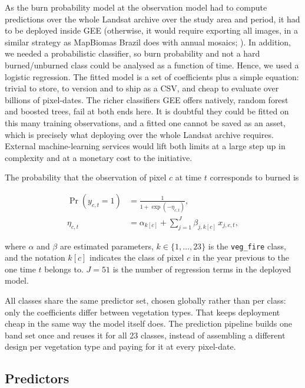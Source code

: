 \documentclass[11pt,a4paper]{article}
\begin{document}
As the burn probability model at the observation model had to compute predictions over the whole 
Landsat archive over the study area and period, it had to be deployed inside GEE
(otherwise, it would require exporting all images, in a similar strategy as MapBiomas Brazil does
with annual mosaics; \cite{alencar2022mapbiomas_fire}). In addition, we needed a probabilistic
classifier, so burn probability and not a hard burned/unburned class could be analysed as a function
of time. Hence, we used a logistic regression. The fitted model is a set of coefficients plus a 
simple equation: trivial to store, to version and to
ship as a CSV, and cheap to evaluate over billions of pixel-dates. The richer classifiers GEE
offers natively, random forest and boosted trees, fail at both ends here. It is doubtful they
could be fitted on this many training observations, and a fitted one cannot be saved as an asset,
which is precisely what deploying over the whole Landsat archive requires. External
machine-learning services would lift both limits at a large step up in complexity and at a
monetary cost to the initiative.

The probability that the observation of pixel \(c\) at time \(t\) corresponds to burned is

\begin{equation}
  \label{eq-logistic}
  \begin{aligned}
    \Pr(y_{c,t} = 1) &= \frac{1}{1 + \exp(-\eta_{c,t})}, \\
    \eta_{c,t} &= \alpha_{k[c]} + \sum_{j=1}^{J} \beta_{j,k[c]}\, x_{j,c,t},
  \end{aligned}
\end{equation}

\noindent where \(\alpha\) and \(\beta\) are estimated parameters, \(k \in \{1,\dots,23\}\) is the
\texttt{veg\_fire} class, and the notation \(k[c]\) indicates the class of pixel \(c\) in the year
previous to the one time \(t\) belongs to. \(J = 51\) is the number of regression terms in the
deployed model.

All classes share the same predictor set, chosen globally rather than per class: only the coefficients
differ between vegetation types. That keeps deployment cheap in the same way the model itself
does. The prediction pipeline builds one band set once and reuses it for all 23 classes, instead
of assembling a different design per vegetation type and paying for it at every pixel-date.

\subsection{Predictors}\label{sec-predictors}
\end{document}

